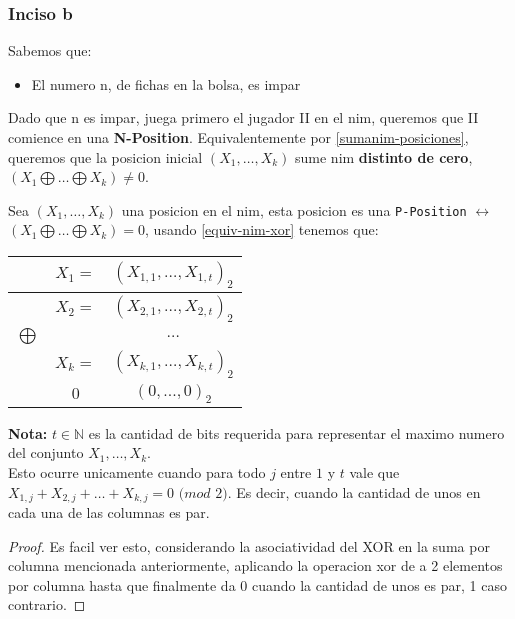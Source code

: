 \subsubsection{Inciso b}
Sabemos que:
\begin{itemize}
	\item El numero n, de fichas en la bolsa, es impar
\end{itemize}

Dado que n es impar, juega primero el jugador II en el nim, queremos que II comience en una \textbf{N-Position}.
Equivalentemente por \ref{sumanim-posiciones}, queremos que la posicion inicial $(X_1, \dots, X_k)$ sume nim \textbf{distinto de cero}, $(X_1 \bigoplus \dots \bigoplus X_k) \neq 0$.

\begin{theorem}
Sea $(X_1, \dots, X_k)$ una posicion en el nim, esta posicion es una \texttt{P-Position} $\leftrightarrow$ $(X_1 \bigoplus \dots \bigoplus X_k) = 0$, usando \ref{equiv-nim-xor} tenemos que:\\

\vspace{0.3cm}

\begin{tabular}{|c|c c|}
			\hline
			& $X_1 	=$ & $	(X_{1,1}, \dots, X_{1,t})_2$ \\\hline
			& $X_2 	=$ & $	(X_{2,1}, \dots, X_{2,t})_2$ \\\hline
$\bigoplus$  & & $ \dots$\\\hline
			& $X_k 	=$ & $	(X_{k,1}, \dots, X_{k,t})_2$ \\\hline 
			& $0$	 & $	(0,   ..., 0)_2$ \\\hline
\end{tabular}
\vspace{0.3cm}

\textbf{Nota:} $t \in \mathbb{N}$ es la cantidad de bits requerida para representar el maximo numero del conjunto ${ X_1, \dots, X_k}$.\\

Esto ocurre unicamente cuando para todo $j$ entre $1$ y $t$ vale que $X_{1,j} + X_{2,j} + \dots + X_{k,j} = 0 $ $ (mod$ $2)$. Es decir, cuando la cantidad de unos en cada una de las columnas es par.\\
\end{theorem}

\begin{proof}
	Es facil ver esto, considerando la asociatividad del XOR en la suma por columna mencionada anteriormente, aplicando la operacion xor de a 2 elementos por columna hasta que finalmente da 0 cuando la cantidad de unos es par, 1 caso contrario.
\end{proof}

